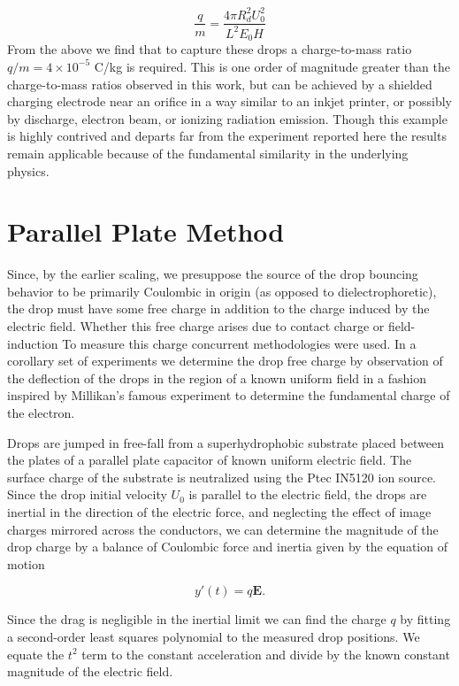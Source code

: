 \documentclass[12pt,a4paper,oneside]{book}
\begin{document}
\[
\frac{q}{m} = \frac{4 \pi R_d^2 U_0^2}{L^2 E_0 H}
\]
From the above we find that to capture these drops a charge-to-mass ratio $q/m=4 \times 10^{-5}$ C/kg is required. This is one order of magnitude greater than the charge-to-mass ratios observed in this work, but can be achieved by a shielded charging electrode near an orifice in a way similar to an inkjet printer, or possibly by discharge, electron beam, or ionizing radiation emission. Though this example is highly contrived and departs far from the experiment reported here the results remain applicable because of the fundamental similarity in the underlying physics.

\appendix
\appendixpage
\noappendicestocpagenum
\addappheadtotoc

\chapter{Parallel Plate Method}
\label{sec.drop_charge}
Since, by the earlier scaling, we presuppose the source of the drop bouncing behavior to be primarily Coulombic in origin (as opposed to dielectrophoretic), the drop must have some free charge in addition to the charge induced by the electric field. Whether this free charge arises due to contact charge or field-induction To measure this charge concurrent methodologies were used. In a corollary set of experiments we determine the drop free charge by observation of the deflection of the drops in the region of a known uniform field in a fashion inspired by Millikan's famous experiment to determine the fundamental charge of the electron.

Drops are jumped in free-fall from a superhydrophobic substrate placed between the plates of a parallel plate capacitor of known uniform electric field. The surface charge of the substrate is neutralized using the Ptec IN5120 ion source. Since the drop initial velocity $U_0$ is parallel to the electric field, the drops are inertial in the direction of the electric force, and neglecting the effect of image charges mirrored across the conductors, we can determine the magnitude of the drop charge by a balance of Coulombic force and inertia given by the equation of motion

\[ y'(t) = q\mathbf{E}. \]

Since the drag is negligible in the inertial limit we can find the charge $q$ by fitting a second-order least squares polynomial to the measured drop positions. We equate the $t^2$ term to the constant acceleration and divide by the known constant magnitude of the electric field.  
\end{document}
